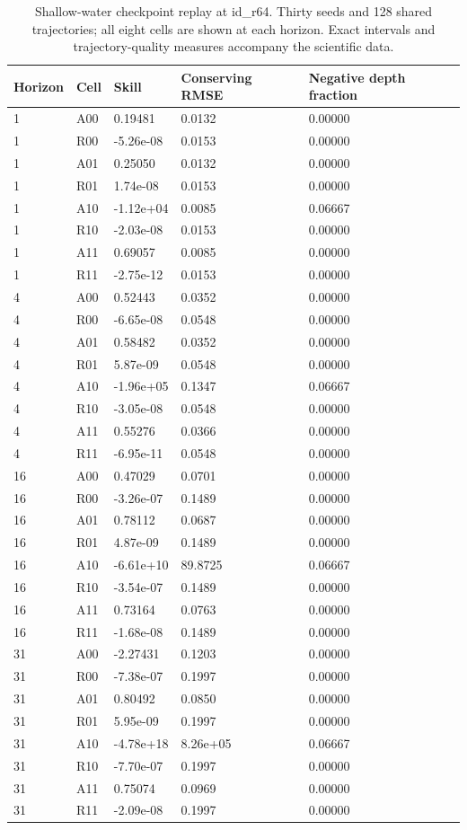 \begin{table}[H]
\centering
\small
\setlength{\tabcolsep}{3pt}
\begin{tabular}{lllll}
\toprule
Horizon & Cell & Skill & Conserving RMSE & Negative depth fraction \\\midrule
1 & A00 & 0.19481 & 0.0132 & 0.00000 \\
1 & R00 & -5.26e-08 & 0.0153 & 0.00000 \\
1 & A01 & 0.25050 & 0.0132 & 0.00000 \\
1 & R01 & 1.74e-08 & 0.0153 & 0.00000 \\
1 & A10 & -1.12e+04 & 0.0085 & 0.06667 \\
1 & R10 & -2.03e-08 & 0.0153 & 0.00000 \\
1 & A11 & 0.69057 & 0.0085 & 0.00000 \\
1 & R11 & -2.75e-12 & 0.0153 & 0.00000 \\
4 & A00 & 0.52443 & 0.0352 & 0.00000 \\
4 & R00 & -6.65e-08 & 0.0548 & 0.00000 \\
4 & A01 & 0.58482 & 0.0352 & 0.00000 \\
4 & R01 & 5.87e-09 & 0.0548 & 0.00000 \\
4 & A10 & -1.96e+05 & 0.1347 & 0.06667 \\
4 & R10 & -3.05e-08 & 0.0548 & 0.00000 \\
4 & A11 & 0.55276 & 0.0366 & 0.00000 \\
4 & R11 & -6.95e-11 & 0.0548 & 0.00000 \\
16 & A00 & 0.47029 & 0.0701 & 0.00000 \\
16 & R00 & -3.26e-07 & 0.1489 & 0.00000 \\
16 & A01 & 0.78112 & 0.0687 & 0.00000 \\
16 & R01 & 4.87e-09 & 0.1489 & 0.00000 \\
16 & A10 & -6.61e+10 & 89.8725 & 0.06667 \\
16 & R10 & -3.54e-07 & 0.1489 & 0.00000 \\
16 & A11 & 0.73164 & 0.0763 & 0.00000 \\
16 & R11 & -1.68e-08 & 0.1489 & 0.00000 \\
31 & A00 & -2.27431 & 0.1203 & 0.00000 \\
31 & R00 & -7.38e-07 & 0.1997 & 0.00000 \\
31 & A01 & 0.80492 & 0.0850 & 0.00000 \\
31 & R01 & 5.95e-09 & 0.1997 & 0.00000 \\
31 & A10 & -4.78e+18 & 8.26e+05 & 0.06667 \\
31 & R10 & -7.70e-07 & 0.1997 & 0.00000 \\
31 & A11 & 0.75074 & 0.0969 & 0.00000 \\
31 & R11 & -2.09e-08 & 0.1997 & 0.00000 \\
\bottomrule
\end{tabular}
\caption{Shallow-water checkpoint replay at id\_r64. Thirty seeds and 128 shared trajectories; all eight cells are shown at each horizon. Exact intervals and trajectory-quality measures accompany the scientific data.}
\label{tab:swe-skill-id_r64}
\end{table}
